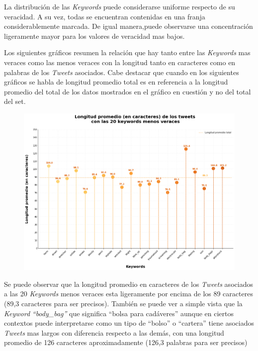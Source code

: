 \documentclass[titlepage,a4paper]{article}
\begin{document}
    La distribución de las \textit{Keywords} puede considerarse uniforme respecto de su veracidad. A su vez, todas se encuentran contenidas en una franja considerablemente marcada. De igual manera,puede observarse una concentración ligeramente mayor para los valores de veracidad mas bajos.
    
    \newpage
    
    Los siguientes gráficos resumen la relación que hay tanto entre las \textit{Keywords} mas veraces como las menos veraces con la longitud tanto en caracteres como en palabras de los \textit{Tweets} asociados. Cabe destacar que cuando en los siguientes gráficos se habla de longitud promedio total es en referencia a la longitud promedio del total de los datos mostrados en el gráfico en cuestión y no del total del set.
    
    \begin{figure}[H]
    \centering
    \includegraphics[width=1\textwidth]{graficos/Analisis de Keyword/long_prom_char_keywords_no_veraces.png}
    \caption{} 
    \end{figure}
    
    Se puede observar que la longitud promedio en caracteres de los \textit{Tweets} asociados a las 20 \textit{Keywords} menos veraces esta ligeramente por encima de los 89 caracteres (89,3 caracteres para ser precisos). También se puede ver a simple vista que la \textit{Keyword} \textit{``body\_bag''} que significa ``bolsa para cadáveres'' aunque en ciertos contextos puede interpretarse como un tipo de ``bolso'' o ``cartera'' tiene asociados \textit{Tweets} mas largos con diferencia respecto a las demás, con una longitud promedio de 126 caracteres aproximadamente (126,3 palabras para ser precisos) 
    
\end{document}
